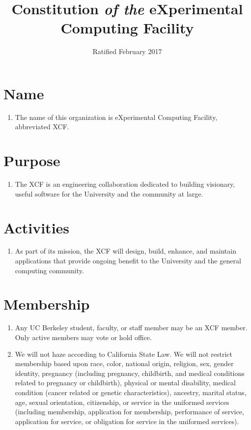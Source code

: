 \documentclass[english,a4paper]{article}
\title{Constitution \textit{of the} eXperimental Computing Facility\vspace{-3ex}}
\date{Ratified February 2017\vspace{-3ex}}
\begin{document}
\maketitle

\section{Name}
\begin{enumerate}
\item The name of this organization is eXperimental Computing Facility,
  abbreviated XCF.
\end{enumerate}
\section{Purpose}

\begin{enumerate}
\item The XCF is an engineering collaboration dedicated to building visionary,
  useful software for the University and the community at large.
\end{enumerate}


\section{Activities}


\begin{enumerate}
\item As part of its mission, the XCF will design, build, enhance, and
  maintain applications that provide ongoing benefit to the University
  and the general computing community.
\end{enumerate}

\section{Membership}

\begin{enumerate}
\item Any UC Berkeley student, faculty, or staff member may be an XCF member.
  Only active members may vote or hold office.

\item We will not haze according to California State Law. We will not restrict
  membership based upon race, color, national origin, religion, sex,
  gender identity, pregnancy (including pregnancy, childbirth, and medical
  conditions related to pregnancy or childbirth), physical or mental
  disability, medical condition (cancer related or genetic characteristics),
  ancestry, marital status, age, sexual orientation, citizenship, or
  service in the uniformed services (including membership, application
  for membership, performance of service, application for service, or
  obligation for service in the uniformed services).
\end{enumerate}
\end{document}
